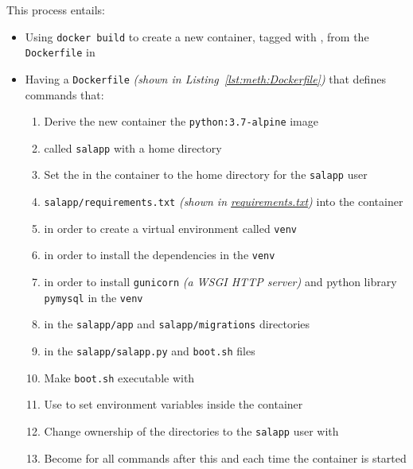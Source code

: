 \begin{enumerate}[leftmargin=0em,label=\protect\listlabelcircle{\arabic*}]
\begin{enumerate}[label=\Roman*~\textcolor{light-gray}{|}]
        This process entails:
        \begin{itemize}
          \item Using \texttt{docker build} to create a new container, tagged with , from the \texttt{Dockerfile} in 
          \item Having a \texttt{Dockerfile} \textit{(shown in Listing~\ref{lst:meth:Dockerfile})} that defines commands that:
            \begin{enumerate}[label=\textcolor{deep-gray}{\roman*\textasciitilde}]
              \item Derive the new container  the \texttt{python:3.7-alpine} image
              \item {} called \texttt{salapp} with a home directory
              \item Set the  in the container to the home directory for the \texttt{salapp} user
              \item {} \texttt{salapp/requirements.txt} \textit{(shown in \hyperref[fcl:salapp:requirements]{requirements.txt})} into the container
              \item {} in order to create a virtual environment called \texttt{venv}
              \item {} in order to install the dependencies in the \texttt{venv}
              \item {} in order to install \texttt{gunicorn} \textit{(a WSGI HTTP server)} and python library \texttt{pymysql} in the \texttt{venv}
              \item {} in the \texttt{salapp/app} and \texttt{salapp/migrations} directories
              \item {} in the \texttt{salapp/salapp.py} and \texttt{boot.sh} files
              \item Make \texttt{boot.sh} executable with 
              \item Use  to set environment variables inside the container
              \item Change ownership of the directories to the \texttt{salapp} user with 
              \item Become  for all commands after this and each time the container is started

\end{enumerate}
\end{itemize}
\end{enumerate}
\end{enumerate}
